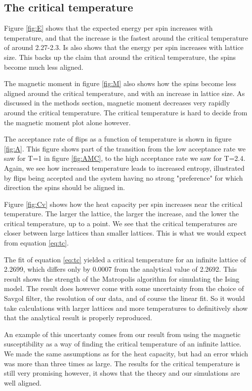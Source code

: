 \documentclass[reprint,english,notitlepage]{revtex4-1}
\begin{document}
\subsection{The critical temperature}
	Figure \ref{fig:E} shows that the expected energy per spin increases with temperature, and that the increase is the fastest around the critical temperature of around 2.27-2.3. Is also shows that the energy per spin increases with lattice size. This backs up the claim that around the critical temperature, the spins become much less aligned.
	
	The magnetic moment in figure \ref{fig:M} also shows how the spins become less aligned around the critical temperature, and with an increase in lattice size. As discussed in the methods section, magnetic moment decreases very rapidly around the critical temperature. The critical temperature is hard to decide from the magnetic moment plot alone however.
	
	The acceptance rate of flips as a function of temperature is shown in figure \ref{fig:A}. This figure shows part of the transition from the low acceptance rate we saw for T=1 in figure \ref{fig:AMC}, to the high acceptance rate we saw for T=2.4. Again, we see how increased temperature leads to increased entropy, illustrated by flips being accepted and the system having no strong "preference" for which direction the spins should be aligned in.
	
	Figure \ref{fig:Cv} shows how the heat capacity per spin increases near the critical temperature. The larger the lattice, the larger the increase, and the lower the critical temperature, up to a point. We see that the critical temperatures are closer between large lattices than smaller lattices. This is what we would expect from equation \ref{eq:tc}.
	
	The fit of equation \ref{eq:tc} yielded a critical temperature for an infinite lattice of 2.2699, which differs only by 0.0007 from the analytical value of 2.2692. This result shows the strength of the Matropolis algorithm for simulating the Ising model. The result does however come with some uncertainty from the choice of Savgol filter, the resolution of our data, and of course the linear fit. So it would take calculations with larger lattices and more temperatures to definitively show that the analytical result is properly reproduced.
	
	An example of this uncertanty comes from our result from using the magnetic susceptibility as a way of finding the critical temperature of an infinite lattice. We made the same assumptions as for the heat capacity, but had an error which was more than three times as large. The results for the critical temperature is still very promising however, it shows that the theory and our simulations are well aligned.
\end{document}
